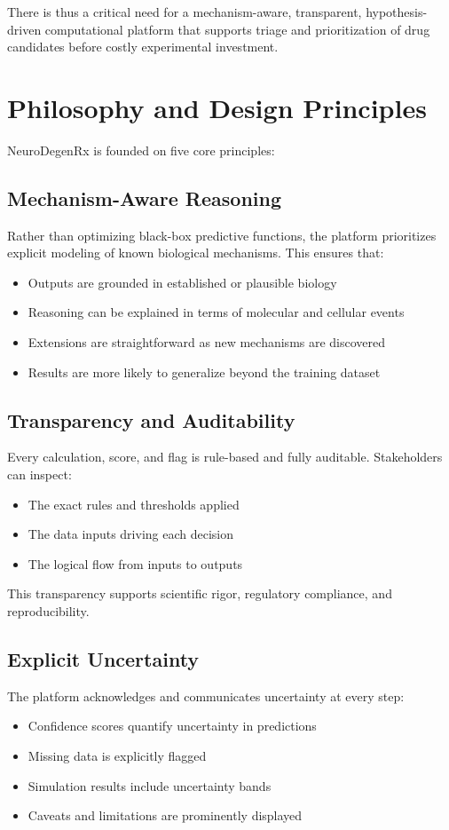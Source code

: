 \documentclass[12pt,a4paper]{article}
\begin{document}
There is thus a critical need for a mechanism-aware, transparent, hypothesis-driven computational platform that supports triage and prioritization of drug candidates before costly experimental investment.

\section{Philosophy and Design Principles}
\label{sec:philosophy}

NeuroDegenRx is founded on five core principles:

\subsection{Mechanism-Aware Reasoning}
Rather than optimizing black-box predictive functions, the platform prioritizes explicit modeling of known biological mechanisms. This ensures that:
\begin{itemize}
  \item Outputs are grounded in established or plausible biology
  \item Reasoning can be explained in terms of molecular and cellular events
  \item Extensions are straightforward as new mechanisms are discovered
  \item Results are more likely to generalize beyond the training dataset
\end{itemize}

\subsection{Transparency and Auditability}
Every calculation, score, and flag is rule-based and fully auditable. Stakeholders can inspect:
\begin{itemize}
  \item The exact rules and thresholds applied
  \item The data inputs driving each decision
  \item The logical flow from inputs to outputs
\end{itemize}
This transparency supports scientific rigor, regulatory compliance, and reproducibility.

\subsection{Explicit Uncertainty}
The platform acknowledges and communicates uncertainty at every step:
\begin{itemize}
  \item Confidence scores quantify uncertainty in predictions
  \item Missing data is explicitly flagged
  \item Simulation results include uncertainty bands
  \item Caveats and limitations are prominently displayed
\end{itemize}
\end{document}
